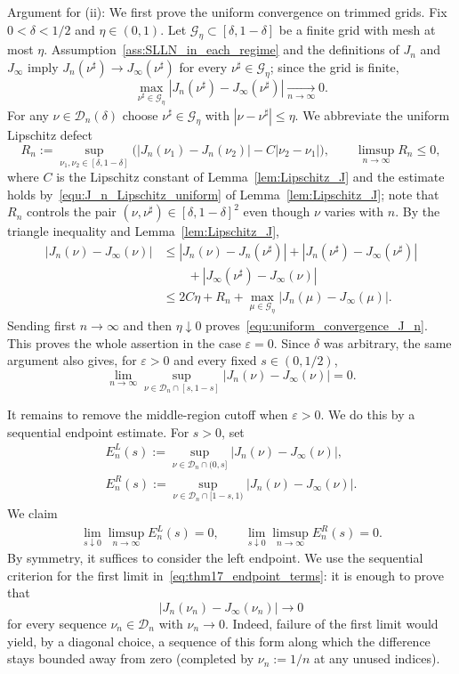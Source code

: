\documentclass[10pt, letterpaper]{amsart}
\begin{document}
Argument for (ii): We first prove the uniform convergence on trimmed grids. Fix $0<\delta<1/2$ and $\eta\in(0,1)$. Let $\mathcal{G}_\eta\subset [\delta,1-\delta]$ be a finite grid with mesh at most $\eta$.  Assumption~\ref{ass:SLLN_in_each_regime} and the definitions of $J_n$ and $J_\infty$ imply $J_n(\nu^\sharp)\to J_\infty(\nu^\sharp)$ for every $\nu^\sharp\in\mathcal{G}_\eta$; since the grid is finite,
\[
\max_{\nu^\sharp\in\mathcal{G}_\eta}|J_n(\nu^\sharp)-J_\infty(\nu^\sharp)|\xrightarrow[n\to\infty]{}0.
\]
For any $\nu\in\mathcal D_n(\delta)$ choose $\nu^\sharp\in\mathcal{G}_\eta$ with $|\nu-\nu^\sharp|\leq\eta$. We abbreviate the uniform Lipschitz defect
\[
R_n:=\sup_{\nu_1,\nu_2\in[\delta,1-\delta]}
\Big(|J_n(\nu_1)-J_n(\nu_2)|-C|\nu_2-\nu_1|\Big),
\qquad
\limsup_{n\to\infty}R_n\leq0,
\]
where  $C$ is the Lipschitz constant of Lemma~\ref{lem:Lipschitz_J} and the estimate holds by~\eqref{equ:J_n_Lipschitz_uniform} of Lemma~\ref{lem:Lipschitz_J}; note that $R_n$ controls the pair $(\nu,\nu^\sharp)\in[\delta,1-\delta]^2$ even though $\nu$ varies with $n$. By the triangle inequality and Lemma~\ref{lem:Lipschitz_J},
\begin{align*}
|J_n(\nu)-J_\infty(\nu)|
&\leq |J_n(\nu)-J_n(\nu^\sharp)|
+ |J_n(\nu^\sharp)-J_\infty(\nu^\sharp)|\\
&\qquad+ |J_\infty(\nu^\sharp)-J_\infty(\nu)|\\
&\leq 2C\eta+R_n+\max_{\mu\in\mathcal{G}_\eta}|J_n(\mu)-J_\infty(\mu)|.
\end{align*}
Sending first $n\to\infty$ and then $\eta\downarrow0$ proves~\eqref{equ:uniform_convergence_J_n}. This proves the whole assertion in the case $\varepsilon=0$. Since $\delta$ was arbitrary, the same argument also gives, for $\varepsilon>0$ and every fixed $s\in(0,1/2)$,
\begin{equation}\label{eq:middle_region_uniform}
    \lim_{n\to\infty}
    \sup_{\nu\in\mathcal D_n\cap[s,1-s]}
    |J_n(\nu)-J_\infty(\nu)|=0.
\end{equation}

It remains to remove the middle-region cutoff when $\varepsilon>0$. We do this by a sequential endpoint estimate. For $s>0$, set
\[
\begin{aligned}
E_n^L(s):=
\sup_{\nu\in\mathcal D_n\cap(0,s]}
|J_n(\nu)-J_\infty(\nu)|,\\
E_n^R(s):=
\sup_{\nu\in\mathcal D_n\cap[1-s,1)}
|J_n(\nu)-J_\infty(\nu)|.
\end{aligned}
\]
We claim
\begin{align}\label{eq:thm17_endpoint_terms}
    \lim_{s\downarrow0}\limsup_{n\to\infty}E_n^L(s)=0,
    \qquad
    \lim_{s\downarrow0}\limsup_{n\to\infty}E_n^R(s)=0.
\end{align}
By symmetry, it suffices to consider the left endpoint. We use the sequential
criterion for the first limit in~\eqref{eq:thm17_endpoint_terms}: it is enough
to prove that
\[
|J_n(\nu_n)-J_\infty(\nu_n)|\longrightarrow0
\]
for every sequence $\nu_n\in\mathcal D_n$ with $\nu_n\to0$. Indeed, failure
of the first limit would yield, by a diagonal choice, a sequence of this form
along which the difference stays bounded away from zero (completed by
$\nu_n:=1/n$ at any unused indices).
\end{document}
